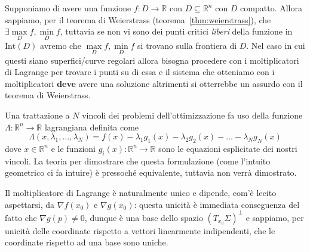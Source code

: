 \begin{remark}
Supponiamo di avere una funzione $f: D \to \mathbb{R}$ con $D \subseteq \mathbb{R}^n$ con $D$ compatto. Allora sappiamo, per il teorema di Weierstrass (teorema~\ref{thm:weierstrass}), che $\exists \max\limits_{D} f, \min\limits_{D} f$, tuttavia se non vi sono dei punti critici \emph{liberi} della funzione in $\text{Int}(D)$ avremo che $\max\limits_{D} f, \min\limits_{D} f$ si trovano sulla frontiera di $D$. Nel caso in cui questi siano superfici/curve regolari allora bisogna procedere con i moltiplicatori di Lagrange per trovare i punti su di essa e il sistema che otteniamo con i moltiplicatori \textbf{deve} avere una soluzione altrimenti si otterrebbe un assurdo con il teorema di Weierstrass.
\end{remark}
\begin{remark}
Una trattazione a $N$ vincoli dei problemi dell'ottimizzazione fa uso della funzione $\Lambda: \mathbb{R}^n \to \mathbb{R}$ lagrangiana definita come 
$$
\Lambda(x, \lambda_1, \ldots, \lambda_N) = f(x)-\lambda_1 g_1(x) - \lambda_2 g_2(x) - \ldots - \lambda_N g_N(x)
$$
dove $x \in \mathbb{R}^n$ e le funzioni $g_i(x):\mathbb{R}^n \to \mathbb{R}$ sono le equazioni esplicitate dei nostri vincoli. La teoria per dimostrare che questa formulazione (come l'intuito geometrico ci fa intuire) è pressoché equivalente, tuttavia non verrà dimostrato.
\end{remark}
\begin{remark}
Il moltiplicatore di Lagrange è naturalmente unico e dipende, com'è lecito aspettarsi, da $\nabla f(x_0)$ e $\nabla g(x_0)$: questa unicità è immediata conseguenza del fatto che $\nabla g(p) \neq 0$, dunque è una base dello spazio $(T_{x_0} \Sigma)^{\perp}$ e sappiamo, per unicità delle coordinate rispetto a vettori linearmente indipendenti, che le coordinate rispetto ad una base sono uniche.
\end{remark}
